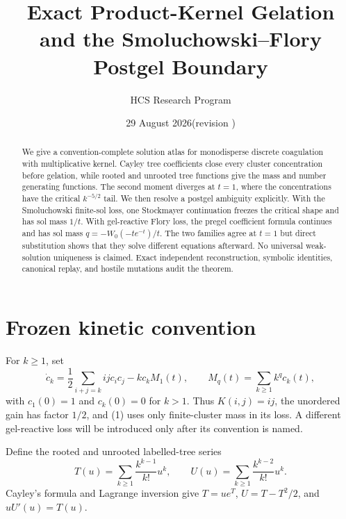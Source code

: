 \documentclass[11pt]{article}
\title{Exact Product-Kernel Gelation and the Smoluchowski--Flory Postgel Boundary}
\author{HCS Research Program}
\date{29 August 2026\quad (revision \CRevisionRound)}
\begin{document}
\maketitle

\begin{abstract}
We give a convention-complete solution atlas for monodisperse discrete
coagulation with multiplicative kernel.  Cayley tree coefficients close every
cluster concentration before gelation, while rooted and unrooted tree
functions give the mass and number generating functions.  The second moment
diverges at $t=1$, where the concentrations have the critical
$k^{-5/2}$ tail.  We then resolve a postgel ambiguity explicitly.  With the
Smoluchowski finite-sol loss, one Stockmayer continuation freezes the critical
shape and has sol mass $1/t$.  With gel-reactive Flory loss, the pregel
coefficient formula continues and has sol mass
$q=-W_0(-te^{-t})/t$.  The two families agree at $t=1$ but direct substitution
shows that they solve different equations afterward.  No universal
weak-solution uniqueness is claimed.  Exact independent reconstruction, symbolic
identities, canonical replay, and hostile mutations audit the theorem.
\end{abstract}

\section{Frozen kinetic convention}
For $k\ge1$, set
\begin{equation}
 \dot c_k=\frac12\sum_{i+j=k}ijc_ic_j-kc_kM_1(t),
 \qquad M_q(t)=\sum_{k\ge1}k^q c_k(t),                 \tag{1}
\end{equation}
with $c_1(0)=1$ and $c_k(0)=0$ for $k>1$.  Thus
$K(i,j)=ij$, the unordered gain has factor $1/2$, and (1) uses only
finite-cluster mass in its loss.  A different gel-reactive loss will be introduced
only after its convention is named.

Define the rooted and unrooted labelled-tree series
\begin{equation}
 T(u)=\sum_{k\ge1}\frac{k^{k-1}}{k!}u^k,\qquad
 U(u)=\sum_{k\ge1}\frac{k^{k-2}}{k!}u^k.              \tag{2}
\end{equation}
Cayley's formula and Lagrange inversion give
$T=ue^T$, $U=T-T^2/2$, and $uU'(u)=T(u)$.
\end{document}
